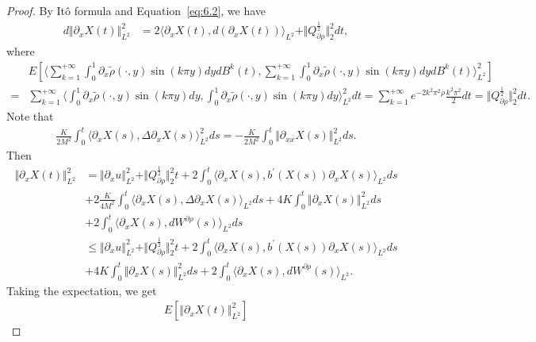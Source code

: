 \documentclass[11pt]{article}
\numberwithin{equation}{section}%
\numberwithin{figure}{section}%
\theoremstyle{remark}
\begin{document}
	\begin{proof}
		By It\^{o} formula and Equation~\eqref{eq:6.2}, we have
		\begin{align*}
			d\Vert \partial_{x}X(t)\Vert _{L^{2}}^{2}&=2\langle \partial_{x}X(t), d(\partial_{x} X(t))\rangle_{L^{2}}+\Vert Q_{\partial\rho}^{\frac{1}{2}}\Vert^{2}_{2}dt,
		\end{align*}
		where 
		\begin{align*}
		&E\left[\langle \sum_{k=1}^{+\infty}\int_{0}^{1} \partial_{x}\tilde{\rho}(\cdot,y)\sin(k\pi y)dydB^{k}(t),\sum_{k=1}^{+\infty}\int_{0}^{1} \partial_{x}\tilde{\rho}(\cdot,y)\sin(k\pi y)dydB^{k}(t)\rangle_{L^{2}}^{2}\right]\\
			=&\sum_{k=1}^{+\infty}\langle \int_{0}^{1} \partial_{x}\tilde{\rho}(\cdot,y)\sin(k\pi y)dy,\int_{0}^{1} \partial_{x}\tilde{\rho}(\cdot,y)\sin(k\pi y)dy\rangle_{L^{2}}^{2}dt=\sum_{k=1}^{+\infty}e^{-2k^{2}\pi^{2}\rho}\frac{k^{2}\pi^{2}}{2}dt=\Vert Q_{\partial\rho}^{\frac{1}{2}}\Vert^{2}_{2}dt.
		\end{align*}
		Note that
		\begin{align*}
			\frac{K}{2M^{2}}\int_{0}^{t}\langle  \partial_{x} X(s), \Delta  \partial_{x} X(s)\rangle_{L^{2}}^{2}ds=-\frac{K}{2M^{2}}\int_{0}^{t}\Vert  \partial_{xx} X(s)\Vert _{L^{2}}^{2}ds.
		\end{align*}
		Then
		\begin{align*}
			\Vert \partial_{x} X(t)\Vert _{L^{2}}^{2}
			&=\Vert\partial_{x} u\Vert _{L^{2}}^{2}+\Vert Q_{\partial\rho}^{\frac{1}{2}}\Vert^{2}_{2}t+2\int_{0}^{t}\langle 
			\partial_{x} X(s),b^{\prime}(X(s))\partial_{x} X(s)\rangle_{L^{2}}ds\\
			&+2\frac{K}{4M^{2}}\int_{0}^{t}\langle \partial_{x} X(s), \Delta \partial_{x} X(s) \rangle_{L^{2}}ds+4K\int_{0}^{t}\Vert \partial_{x} X(s)\Vert _{L^{2}}^{2}ds\\
			&+2\int_{0}^{t}\langle \partial_{x} X(s), dW^{\partial\rho}(s)\rangle_{L^{2}}ds\\
			&\leq\Vert \partial_{x} u\Vert _{L^{2}}^{2}+\Vert Q_{\partial\rho}^{\frac{1}{2}}\Vert^{2}_{2}t+2\int_{0}^{t}\langle \partial_{x} X(s),  b^{\prime}(X(s))\partial_{x} X(s)\rangle_{L^{2}}ds\\
			&+4K\int_{0}^{t}\Vert \partial_{x} X(s)\Vert _{L^{2}}^{2}ds+2\int_{0}^{t}\langle\partial_{x} X(s), dW^{\partial\rho}(s)\rangle_{L^{2}}.
		\end{align*}
		Taking the expectation, we get
		\begin{align*}
			E[\Vert\partial_{x} X(t)\Vert _{L^{2}}^{2}]

\end{align*}
\end{proof}
\end{document}
